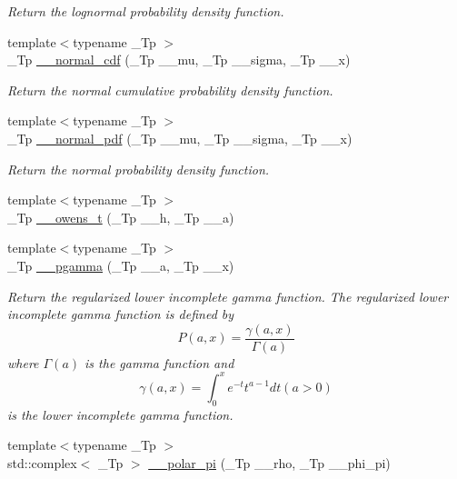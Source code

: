 \begin{DoxyCompactItemize}
\begin{DoxyCompactList}\small\item\em Return the lognormal probability density function. \end{DoxyCompactList}\item 
{\footnotesize template$<$typename \+\_\+\+Tp $>$ }\\\+\_\+\+Tp \hyperlink{namespacestd_1_1____detail_a718b0f0884f0bc91b038ef4dabbb7427}{\+\_\+\+\_\+normal\+\_\+cdf} (\+\_\+\+Tp \+\_\+\+\_\+mu, \+\_\+\+Tp \+\_\+\+\_\+sigma, \+\_\+\+Tp \+\_\+\+\_\+x)
\begin{DoxyCompactList}\small\item\em Return the normal cumulative probability density function. \end{DoxyCompactList}\item 
{\footnotesize template$<$typename \+\_\+\+Tp $>$ }\\\+\_\+\+Tp \hyperlink{namespacestd_1_1____detail_a6211a0741c8e2dfb219fb52d072295f4}{\+\_\+\+\_\+normal\+\_\+pdf} (\+\_\+\+Tp \+\_\+\+\_\+mu, \+\_\+\+Tp \+\_\+\+\_\+sigma, \+\_\+\+Tp \+\_\+\+\_\+x)
\begin{DoxyCompactList}\small\item\em Return the normal probability density function. \end{DoxyCompactList}\item 
{\footnotesize template$<$typename \+\_\+\+Tp $>$ }\\\+\_\+\+Tp \hyperlink{namespacestd_1_1____detail_a5b50a9d8beaca5a637c8293ab01bf124}{\+\_\+\+\_\+owens\+\_\+t} (\+\_\+\+Tp \+\_\+\+\_\+h, \+\_\+\+Tp \+\_\+\+\_\+a)
\item 
{\footnotesize template$<$typename \+\_\+\+Tp $>$ }\\\+\_\+\+Tp \hyperlink{namespacestd_1_1____detail_a009273f90a2496eb24abf92cd957b851}{\+\_\+\+\_\+pgamma} (\+\_\+\+Tp \+\_\+\+\_\+a, \+\_\+\+Tp \+\_\+\+\_\+x)
\begin{DoxyCompactList}\small\item\em Return the regularized lower incomplete gamma function. The regularized lower incomplete gamma function is defined by \[ P(a,x) = \frac{\gamma(a,x)}{\Gamma(a)} \] where $ \Gamma(a) $ is the gamma function and \[ \gamma(a,x) = \int_0^x e^{-t}t^{a-1}dt (a > 0) \] is the lower incomplete gamma function. \end{DoxyCompactList}\item 
{\footnotesize template$<$typename \+\_\+\+Tp $>$ }\\std\+::complex$<$ \+\_\+\+Tp $>$ \hyperlink{namespacestd_1_1____detail_ac69e259ad511fcc7a54c6ec315adcfa4}{\+\_\+\+\_\+polar\+\_\+pi} (\+\_\+\+Tp \+\_\+\+\_\+rho, \+\_\+\+Tp \+\_\+\+\_\+phi\+\_\+pi)

\end{DoxyCompactItemize}
